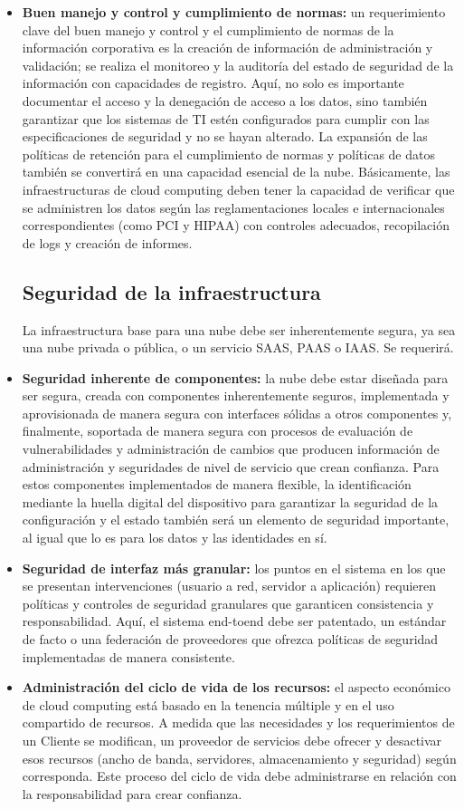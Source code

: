 \documentclass[12pt,a4paper]{article}
\begin{document}
\begin{itemize}
\item \textbf{Buen manejo y control y cumplimiento de normas:}
un requerimiento clave del buen manejo y control y el
cumplimiento de normas de la información corporativa
es la creación de información de administración y
validación; se realiza el monitoreo y la auditoría del
estado de seguridad de la información con capacidades
de registro. Aquí, no solo es importante documentar
el acceso y la denegación de acceso a los datos,
sino también garantizar que los sistemas de TI estén
configurados para cumplir con las especificaciones de
seguridad y no se hayan alterado. La expansión de las
políticas de retención para el cumplimiento de normas
y políticas de datos también se convertirá en una
capacidad esencial de la nube. Básicamente, las
infraestructuras de cloud computing deben tener la
capacidad de verificar que se administren los datos
según las reglamentaciones locales e internacionales
correspondientes (como PCI y HIPAA) con controles
adecuados, recopilación de logs y creación de informes.

\subsection{Seguridad de la infraestructura}
La infraestructura base para una nube debe ser
inherentemente segura, ya sea una nube privada o pública,
o un servicio SAAS, PAAS o IAAS. Se requerirá.
\item \textbf{Seguridad inherente de componentes:} la nube debe
estar diseñada para ser segura, creada con componentes
inherentemente seguros, implementada y aprovisionada
de manera segura con interfaces sólidas a otros
componentes y, finalmente, soportada de manera
segura con procesos de evaluación de vulnerabilidades
y administración de cambios que producen información
de administración y seguridades de nivel de servicio que
crean confianza. Para estos componentes implementados
de manera flexible, la identificación mediante la huella
digital del dispositivo para garantizar la seguridad de la
configuración y el estado también será un elemento de
seguridad importante, al igual que lo es para los datos
y las identidades en sí.
\item \textbf{Seguridad de interfaz más granular:} los puntos en
el sistema en los que se presentan intervenciones
(usuario a red, servidor a aplicación) requieren políticas
y controles de seguridad granulares que garanticen
consistencia y responsabilidad. Aquí, el sistema end-toend debe ser patentado, un estándar de facto o una
federación de proveedores que ofrezca políticas de
seguridad implementadas de manera consistente.
\item \textbf{Administración del ciclo de vida de los recursos:} el aspecto
económico de cloud computing está basado en la tenencia
múltiple y en el uso compartido de recursos. A medida que
las necesidades y los requerimientos de un Cliente se
modifican, un proveedor de servicios debe ofrecer y
desactivar esos recursos (ancho de banda, servidores,
almacenamiento y seguridad) según corresponda. Este
proceso del ciclo de vida debe administrarse en relación
con la responsabilidad para crear confianza.

\end{itemize}
\end{document}
